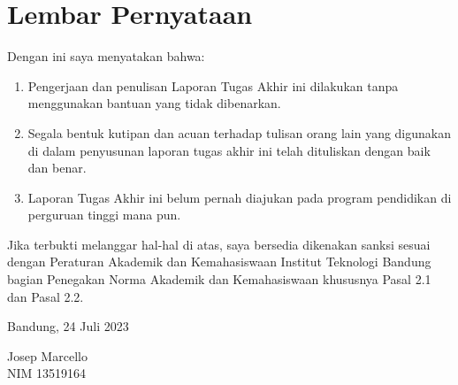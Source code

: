 \chapter*{Lembar Pernyataan}

Dengan ini saya menyatakan bahwa:

\begin{enumerate}

	\item Pengerjaan dan penulisan Laporan Tugas Akhir ini dilakukan tanpa
	      menggunakan bantuan yang tidak dibenarkan.
	\item Segala bentuk kutipan dan acuan terhadap tulisan orang lain yang
	      digunakan di dalam penyusunan laporan tugas akhir ini telah dituliskan
	      dengan baik dan benar.
	\item Laporan Tugas Akhir ini belum pernah diajukan pada program pendidikan
	      di perguruan tinggi mana pun.

\end{enumerate}

Jika terbukti melanggar hal-hal di atas, saya bersedia dikenakan sanksi sesuai
dengan Peraturan Akademik dan Kemahasiswaan Institut Teknologi Bandung bagian
Penegakan Norma Akademik dan Kemahasiswaan khususnya Pasal 2.1 dan Pasal 2.2.

\vspace{10mm}

Bandung, 24 Juli 2023

\vspace{30mm}

Josep Marcello \\
NIM 13519164
